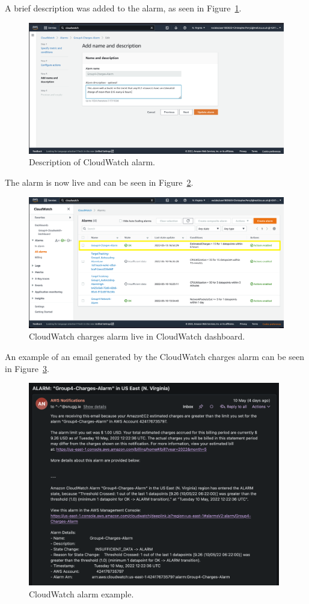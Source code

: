 A brief description was added to the alarm, as seen in Figure~\ref{fig:cloudwatch-charges-description}.

\begin{figure}[!htbp]
    \centering
    \includegraphics[width=\textwidth]{resources/cloudwatch/cloudwatch-charges-description}
    \caption{Description of CloudWatch alarm.}
    \label{fig:cloudwatch-charges-description}
\end{figure}

\clearpage
The alarm is now live and can be seen in Figure~\ref{fig:cloudwatch-charges-dashboard}.

\begin{figure}[!htbp]
    \centering
    \includegraphics[width=125mm]{resources/cloudwatch/cloudwatch-charges-dashboard}
    \caption{CloudWatch charges alarm live in CloudWatch dashboard.}
    \label{fig:cloudwatch-charges-dashboard}
\end{figure}

An example of an email generated by the CloudWatch charges alarm can be seen in
Figure~\ref{fig:cloudwatch-alarm-example}.

\begin{figure}[!htbp]
    \centering
    \includegraphics[width=110mm]{resources/cloudwatch/cloudwatch-alarm-example}
    \caption{CloudWatch alarm example.}
    \label{fig:cloudwatch-alarm-example}
\end{figure}
